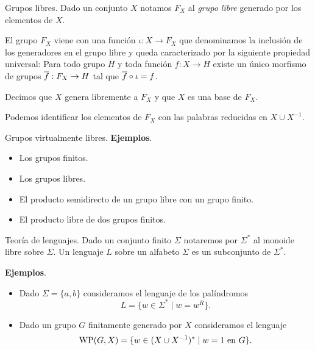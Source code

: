 \documentclass[aspectratio=169, 10pt]{beamer}
\begin{document}
\begin{frame}[fragile]{Grupos libres.}
	Dado un conjunto $X$ notamos $F_{X}$ al \emph{grupo libre} generado por los elementos de $X$. 

	El grupo $F_{X}$ viene con una función $\iota: X \to F_{X}$ que denominamos la inclusión de los generadores en el grupo libre y queda caracterizado por la siguiente propiedad universal: 
	\onslide<3->
	Para todo grupo $H$ y toda función $f:X \to H$ existe un único morfismo de grupos $\overline f: F_{X} \to H$ tal que $\overline f \circ \iota = f$.
	\begin{center}
	\end{center}

	Decimos que $X$ genera libremente a $F_{X}$ y que $X$ es una base de $F_{X}$.

	Podemos identificar los elementos de $F_{X}$ con las palabras reducidas en $X \cup X^{-1}$.
\end{frame}

	\begin{frame}[fragile]{Grupos virtualmente libres.}
		\onslide<2->
		\textbf{Ejemplos}.
			\begin{itemize}
				\item \pause Los grupos finitos.
				\item \pause Los grupos libres.
				\item \pause El producto semidirecto de un grupo libre con un grupo finito.
				\item \pause El producto libre de dos grupos finitos.
			\end{itemize}
	\end{frame}

	\begin{frame}[fragile]{Teoría de lenguajes.}
		Dado un conjunto finito $\Sigma$ notaremos por $\Sigma^*$ al monoide libre sobre $\Sigma$.
		\pause 
		Un lenguaje $L$ sobre un alfabeto $\Sigma$ es un subconjunto de $\Sigma^*$.
		\pause 	

			\textbf{Ejemplos}.


			\begin{itemize}
				\item 
					Dado $\Sigma = \{a,b\}$ consideramos el lenguaje de los palíndromos
					\[
						L = \{ w \in \Sigma^{*} \mid w = w^{R}  \}.
					\]
				\item \pause 
					Dado un grupo $G$ finitamente generado por $X$ consideramos el lenguaje
					\[
						\text{WP}(G, X) = \{ w \in (X \cup X^{-1})^{*} \mid w = 1 \ \text{en $G$} \}.	
					\]
			\end{itemize}
	\end{frame}
	
\end{document}
